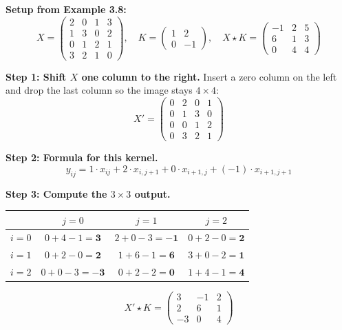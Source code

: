 \textbf{Setup from Example 3.8:}
\[
X = \begin{pmatrix} 2 & 0 & 1 & 3 \\ 1 & 3 & 0 & 2 \\ 0 & 1 & 2 & 1 \\ 3 & 2 & 1 & 0 \end{pmatrix}, \quad
K = \begin{pmatrix} 1 & 2 \\ 0 & -1 \end{pmatrix}, \quad
X \star K = \begin{pmatrix} -1 & 2 & 5 \\ 6 & 1 & 3 \\ 0 & 4 & 4 \end{pmatrix}
\]

\textbf{Step 1: Shift $X$ one column to the right.}
Insert a zero column on the left and drop the last column so the image stays $4\times 4$:
\[
X' = \begin{pmatrix} 0 & 2 & 0 & 1 \\ 0 & 1 & 3 & 0 \\ 0 & 0 & 1 & 2 \\ 0 & 3 & 2 & 1 \end{pmatrix}
\]

\textbf{Step 2: Formula for this kernel.}
\[
y_{ij} = 1\cdot x_{ij} + 2\cdot x_{i,j+1} + 0\cdot x_{i+1,j} + (-1)\cdot x_{i+1,j+1}
\]

\textbf{Step 3: Compute the $3\times 3$ output.}

\begin{center}
\begin{tabular}{cccc}
\toprule
 & $j = 0$ & $j = 1$ & $j = 2$ \\
\midrule
$i = 0$ & $0 + 4 - 1 = \mathbf{3}$ & $2 + 0 - 3 = \mathbf{-1}$ & $0 + 2 - 0 = \mathbf{2}$ \\
$i = 1$ & $0 + 2 - 0 = \mathbf{2}$ & $1 + 6 - 1 = \mathbf{6}$ & $3 + 0 - 2 = \mathbf{1}$ \\
$i = 2$ & $0 + 0 - 3 = \mathbf{-3}$ & $0 + 2 - 2 = \mathbf{0}$ & $1 + 4 - 1 = \mathbf{4}$ \\
\bottomrule
\end{tabular}
\end{center}

\[
X' \star K = \begin{pmatrix} 3 & -1 & 2 \\ 2 & 6 & 1 \\ -3 & 0 & 4 \end{pmatrix}
\]

